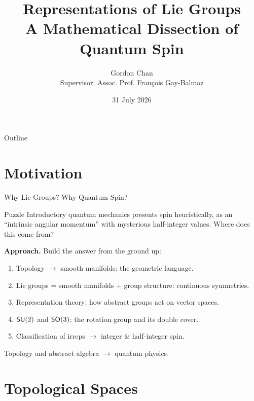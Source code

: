 \documentclass[9pt]{beamer}
\title{Representations of Lie Groups\\A Mathematical Dissection of Quantum Spin}
\author{Gordon Chan\\Supervisor: Assoc. Prof. François Gay-Balmaz}
\date{31 July 2026}
\begin{document}
\begin{frame}
\titlepage
\end{frame}

\begin{frame}{Outline}
\tableofcontents
\end{frame}

\section{Motivation}

\begin{frame}{Why Lie Groups? Why Quantum Spin?}
\begin{block}{Puzzle}
Introductory quantum mechanics presents spin heuristically, as an
``intrinsic angular momentum'' with mysterious half-integer values.
Where does this come from?
\end{block}

\pause
\vspace{0.5em}
\textbf{Approach.} Build the answer from the ground up:
\begin{enumerate}
\item Topology $\to$ smooth manifolds: the geometric language.
\item Lie groups = smooth manifolds + group structure: continuous symmetries.
\item Representation theory: how abstract groups act on vector spaces.
\item $\operatorname{\mathsf{SU}}(2)$ and $\operatorname{\mathsf{SO}}(3)$: the rotation group and its double cover.
\item Classification of irreps $\to$ integer \& half-integer spin.
\end{enumerate}

\pause
\vspace{0.3em}
Topology and abstract algebra $\longrightarrow$ quantum physics.
\end{frame}

\section{Topological Spaces}
\end{document}
